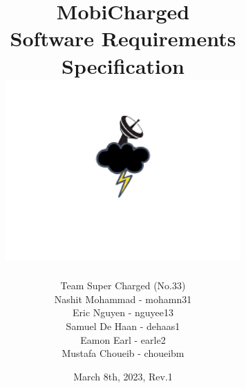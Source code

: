 \documentclass[12pt, titlepage]{article}
\begin{document}
\title{
    MobiCharged\\Software Requirements Specification
    \includegraphics[width=9cm]{images/mobicharged.png} 
}
\author{Team Super Charged (No.33)
		\\ Nashit Mohammad - mohamn31
		\\ Eric Nguyen - nguyee13
		\\ Samuel De Haan - dehaas1
		\\ Eamon Earl - earle2
		\\ Mustafa Choueib - choueibm
}
    

\date{March 8th, 2023, Rev.1}


\maketitle

\tableofcontents
\listoffigures
\listoftables
\end{document}
